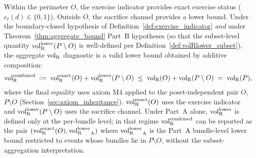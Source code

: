 \begin{remark}
Within the perimeter $O$, the exercise indicator provides exact
exercise status ($e_t(d) \in \{0, 1\}$).  Outside $O$, the
sacrifice channel provides a lower bound.  Under the
boundary-closed hypothesis of
Definition~\ref{def:exercise_indicator} \emph{and} under
Theorem~\ref{thm:aggregate_bound} Part~B hypotheses (so that
the subset-level quantity ${\operatorname{vol}_{\mathrm{R}}^{\mathrm{lower}}}(P \setminus O)$ is
well-defined per Definition~\ref{def:volRlower_subset}), the
aggregate ${\operatorname{vol}_{\mathrm{R}}}$ diagnostic is a valid lower bound obtained by
additive composition:
\[
  {\operatorname{vol}_{\mathrm{R}}^{\mathrm{combined}}} \;:=\; {\operatorname{vol}_{\mathrm{R}}^{\mathrm{exact}}}(O) + {\operatorname{vol}_{\mathrm{R}}^{\mathrm{lower}}}(P \setminus O)
  \;\leq\; {\operatorname{vol}_{\mathrm{R}}}(O) + {\operatorname{vol}_{\mathrm{R}}}(P \setminus O)
  \;=\; {\operatorname{vol}_{\mathrm{R}}}(P),
\]
where the final equality uses axiom M4 applied to the
poset-independent pair $O$, $P \setminus O$
(Section~\ref{sec:axiom_inheritance}).  ${\operatorname{vol}_{\mathrm{R}}^{\mathrm{exact}}}(O)$ uses the
exercise indicator and ${\operatorname{vol}_{\mathrm{R}}^{\mathrm{lower}}}(P \setminus O)$ uses the
sacrifice channel.  Under Part~A alone, ${\operatorname{vol}_{\mathrm{R}}^{\mathrm{lower}}}$ is defined
only at the per-bundle level; in that regime ${\operatorname{vol}_{\mathrm{R}}^{\mathrm{combined}}}$ can be
reported as the pair $({\operatorname{vol}_{\mathrm{R}}^{\mathrm{exact}}}(O), {\operatorname{vol}_{\mathrm{R}}^{\mathrm{lower}}}_{\mathrm{A}})$
where ${\operatorname{vol}_{\mathrm{R}}^{\mathrm{lower}}}_{\mathrm{A}}$ is the Part~A bundle-level lower
bound restricted to events whose bundles lie in $P \setminus O$,
without the subset-aggregation interpretation.
\end{remark}

